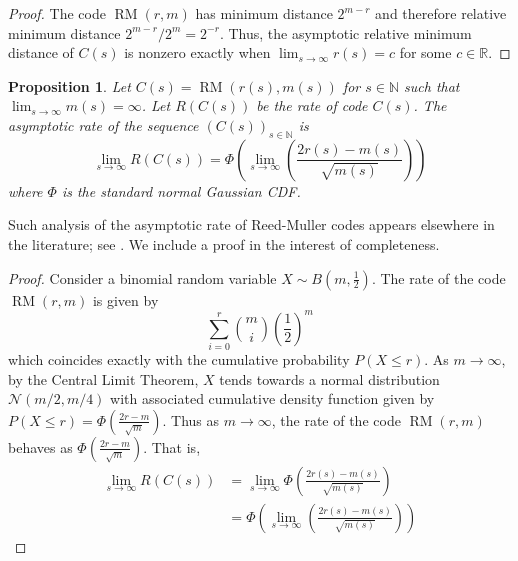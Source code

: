 \documentclass{amsart}
\newtheorem{proposition}[theorem]{Proposition}
\theoremstyle{definition}
\newcommand{\R}{{\mathbb{R}}}
\newcommand{\N}{{\mathbb{N}}}
\DeclareMathOperator{\RM}{RM}
\begin{document}
\begin{proof} 
The code $\RM(r,m)$ has minimum distance $2^{m-r}$ and therefore relative minimum distance $2^{m-r}/2^m=2^{-r}$. Thus, the asymptotic relative minimum distance of $C(s)$ is nonzero exactly when $\lim_{s\to \infty} r(s)=c$ for some $c\in \R$.
\end{proof}


\begin{proposition}
Let $C(s)=\RM(r(s),m(s))$ for $s\in \N$ such that $\lim_{s\to \infty}m(s)=\infty$. Let $R(C(s))$ be the rate of code $C(s)$. The asymptotic rate of the sequence $(C(s))_{s\in \N}$ is     \[\lim_{s\to \infty}R(C(s)) = \Phi\left (\lim_{s \to \infty} \left (\frac{2r(s) - m(s)}{\sqrt{m(s)}}\right)\right)\] where $\Phi$ is the standard normal Gaussian CDF.
\label{prop:rate}
\end{proposition}

Such analysis of the asymptotic rate of Reed-Muller codes appears elsewhere in the literature; see \cite{pfister-friends}. We include a proof in the interest of completeness. 

\begin{proof}
Consider a binomial random variable $X\sim B(m,\frac{1}{2})$. The rate of the code $\RM(r,m)$ is given by \[ \sum_{i=0}^r {m \choose i}\left(\frac{1}{2}\right)^m \] which coincides exactly with the cumulative probability $P(X\leq r)$. As $m\to\infty$, by the Central Limit Theorem, $X$ tends towards a normal distribution $\mathcal{N}(m/2,m/4)$ with associated cumulative density function given by  $P(X\leq r)=\Phi\left(\frac{2r-m}{\sqrt{m}}\right)$. Thus as $m\to \infty$, the rate of the code $\RM(r,m)$ behaves as $\Phi\left(\frac{2r-m}{\sqrt{m}}\right)$. That is, 
\begin{align*}
    \lim_{s\to \infty} R(C(s))   & = \lim_{s\to \infty} \Phi \left (\frac{2r(s) - m(s)}{\sqrt{m(s)}}\right)\\ 
                                & =  \Phi\left (\lim_{s \to \infty} \left (\frac{2r(s) - m(s)}{\sqrt{m(s)}}\right)\right)
\end{align*}
\end{proof}
\end{document}
